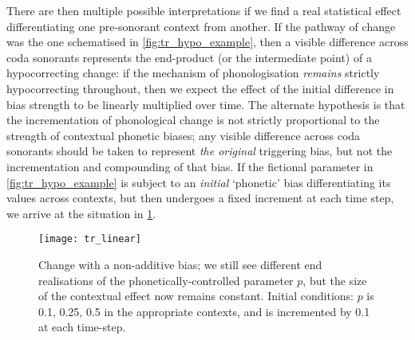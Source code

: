 There are then multiple possible interpretations if we find a real statistical effect differentiating one pre-sonorant context from another. If the pathway of change was the one schematised in \cref{fig:tr_hypo_example}, then a visible difference across coda sonorants represents the end-product (or the intermediate point) of a hypocorrecting change: if the mechanism of phonologisation \emph{remains} strictly hypocorrecting throughout, then we expect the effect of the initial difference in bias strength to be linearly multiplied over time. The alternate hypothesis is that the incrementation of phonological change is not strictly proportional to the strength of contextual phonetic biases; any visible difference across coda sonorants should be taken to represent \emph{the original} triggering bias, but not the incrementation and compounding of that bias. If the fictional parameter in \cref{fig:tr_hypo_example} is subject to an \emph{initial} `phonetic' bias differentiating its values across contexts, but then undergoes a fixed increment at each time step, we arrive at the situation in \cref{fig:tr_nonhypo_example}.

\begin{figure}[ht]
  \centering
  \texttt{[image: tr\_linear]}
  \caption[A rough illustration of constant-slope change.]{Change with a non-additive bias; we still see different end realisations of the phonetically-controlled parameter $p$, but the size of the contextual effect now remains constant. Initial conditions: $p$ is 0.1, 0.25, 0.5 in the appropriate contexts, and is incremented by 0.1 at each time-step.}
  \label{fig:tr_nonhypo_example}
\end{figure}

